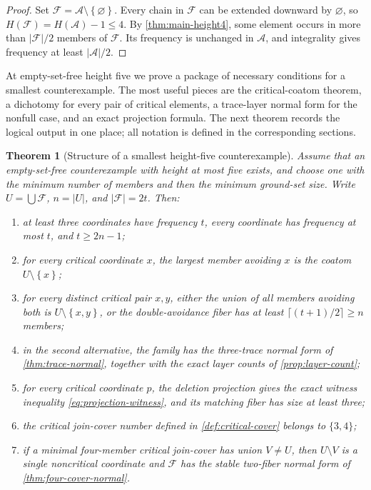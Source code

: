 \documentclass[11pt,reqno]{amsart}
\numberwithin{equation}{section}
\newtheorem{theorem}{Theorem}[section]
\theoremstyle{definition}
\theoremstyle{remark}
\newcommand{\F}{\mathcal{F}}
\newcommand{\A}{\mathcal{A}}
\newcommand{\1}{\mathbf{1}}
\newcommand{\set}[1]{\left\{#1\right\}}
\newcommand{\abs}[1]{\left|#1\right|}
\begin{document}
\begin{proof}
Set \(\F=\A\setminus\set{\varnothing}\).  Every chain in \(\F\) can be extended downward by \(\varnothing\), so \(H(\F)=H(\A)-1\le4\).  By \cref{thm:main-height4}, some element occurs in more than \(\abs{\F}/2\) members of \(\F\).  Its frequency is unchanged in \(\A\), and integrality gives frequency at least \(\abs{\A}/2\).
\end{proof}

At empty-set-free height five we prove a package of necessary conditions for a smallest counterexample.  The most useful pieces are the critical-coatom theorem, a dichotomy for every pair of critical elements, a trace-layer normal form for the nonfull case, and an exact projection formula.  The next theorem records the logical output in one place; all notation is defined in the corresponding sections.

\begin{theorem}[Structure of a smallest height-five counterexample]\label{thm:height5-summary}
Assume that an empty-set-free counterexample with height at most five exists, and choose one with the minimum number of members and then the minimum ground-set size.  Write \(U=\bigcup\F\), \(n=\abs{U}\), and \(\abs{\F}=2t\).  Then:
\begin{enumerate}[label=\textup{(\roman*)},leftmargin=2.5em]
\item at least three coordinates have frequency \(t\), every coordinate has frequency at most \(t\), and \(t\ge2n-1\);
\item for every critical coordinate \(x\), the largest member avoiding \(x\) is the coatom \(U\setminus\set{x}\);
\item for every distinct critical pair \(x,y\), either the union of all members avoiding both is \(U\setminus\set{x,y}\), or the double-avoidance fiber has at least \(\lceil(t+1)/2\rceil\ge n\) members;
\item in the second alternative, the family has the three-trace normal form of \cref{thm:trace-normal}, together with the exact layer counts of \cref{prop:layer-count};
\item for every critical coordinate \(p\), the deletion projection gives the exact witness inequality \cref{eq:projection-witness}, and its matching fiber has size at least three;
\item the critical join-cover number defined in \cref{def:critical-cover} belongs to \(\{3,4\}\);
\item if a minimal four-member critical join-cover has union \(V\ne U\), then \(U\setminus V\) is a single noncritical coordinate and \(\F\) has the stable two-fiber normal form of \cref{thm:four-cover-normal}.
\end{enumerate}
\end{theorem}
\end{document}
